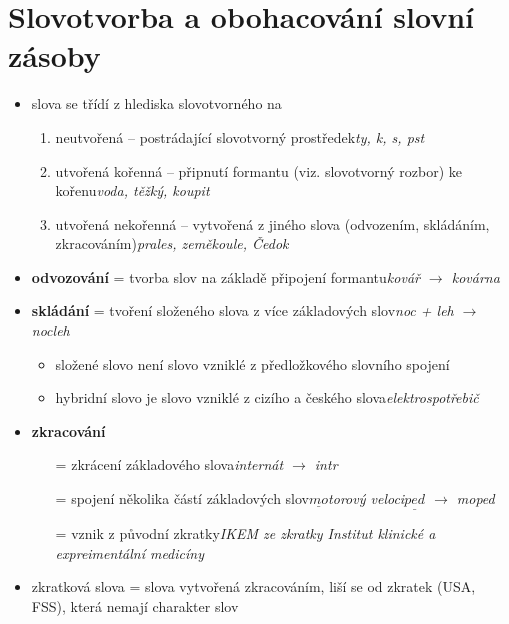 \documentclass{memoir}
\begin{document}
\section*{Slovotvorba a obohacování slovní zásoby}
	\begin{itemize}
		\item slova se třídí z hlediska slovotvorného na
		\begin{enumerate}
			\item neutvořená -- postrádající slovotvorný prostředek\hfill\textit{ty, k, s, pst}
			\item utvořená kořenná -- připnutí formantu (viz. slovotvorný rozbor) ke kořenu\hfill\textit{voda, těžký, koupit}
			\item utvořená nekořenná -- vytvořená z jiného slova (odvozením, skládáním, zkracováním)\hfill\textit{prales, zeměkoule, Čedok}
		\end{enumerate}
		\item \textbf{odvozování} = tvorba slov na základě připojení formantu\hfill\textit{kovář $\rightarrow$ kovárna}
		\item \textbf{skládání} = tvoření složeného slova z více základových slov\hfill\textit{noc + leh $\rightarrow$ nocleh}
		\begin{itemize}
			\item složené slovo není slovo vzniklé z předložkového slovního spojení
			\item hybridní slovo je slovo vzniklé z cizího a českého slova\hfill\textit{elektrospotřebič}
		\end{itemize}
		\item \textbf{zkracování}
		\begin{itemize}
			\item[=] zkrácení základového slova\hfill\textit{internát $\rightarrow$ intr}
			\item[=] spojení několika částí základových slov\hfill\textit{$\underline{mo}$torový veloci$\underline{ped}$ $\rightarrow$ moped}
			\item[=] vznik z původní zkratky\hfill\textit{IKEM ze zkratky Institut klinické a expreimentální medicíny}
		\end{itemize}
		\item zkratková slova = slova vytvořená zkracováním, liší se od zkratek (USA, FSS), která nemají charakter slov\\
	\end{itemize}
\end{document}
